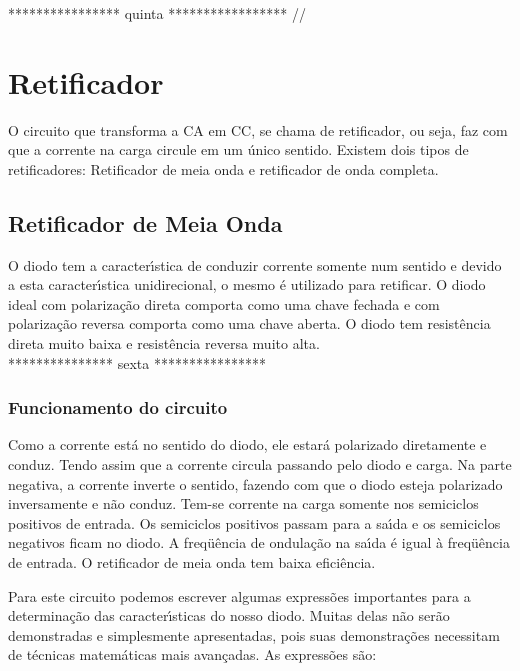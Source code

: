 **************** quinta ***************** //

\section{Retificador}

O circuito que transforma a CA em CC, se chama de retificador, ou seja, faz com que a corrente na carga circule em um \'{u}nico sentido. Existem dois tipos de retificadores: Retificador de meia onda e retificador de onda completa.

\subsection{Retificador de Meia Onda}

O diodo tem a caracter\'{\i}stica de conduzir corrente somente num sentido e devido a esta caracter\'{\i}stica unidirecional, o mesmo \'{e} utilizado para retificar. O diodo ideal com polariza\c{c}\~{a}o direta comporta como uma chave fechada e com polariza\c{c}\~{a}o reversa comporta como uma chave aberta. O diodo tem resist\^{e}ncia direta muito baixa e resist\^{e}ncia reversa muito alta. \\

*************** sexta **************** \\

\subsubsection{Funcionamento do circuito}
Como a corrente est\'{a} no sentido do diodo, ele estar\'{a} polarizado diretamente e conduz. Tendo assim que a corrente circula passando pelo diodo e carga. Na parte negativa, a corrente inverte o sentido, fazendo com que o diodo esteja polarizado inversamente e n\~{a}o conduz. Tem-se corrente na carga somente nos semiciclos positivos de entrada. Os semiciclos positivos passam para a sa\'{\i}da e os semiciclos negativos ficam no diodo. A freq\"{u}\^{e}ncia de ondula\c{c}\~{a}o na sa\'{\i}da \'{e} igual \`{a} freq\"{u}\^{e}ncia de entrada. O retificador de meia onda tem baixa efici\^{e}ncia.

Para este circuito podemos escrever algumas express\~{o}es importantes para a determina\c{c}\~{a}o das caracter\'{\i}sticas do nosso diodo. Muitas delas n\~{a}o ser\~{a}o demonstradas e simplesmente apresentadas, pois suas demonstra\c{c}\~{o}es necessitam de t\'{e}cnicas matem\'{a}ticas mais avan\c{c}adas. As express\~{o}es s\~{a}o: \\

